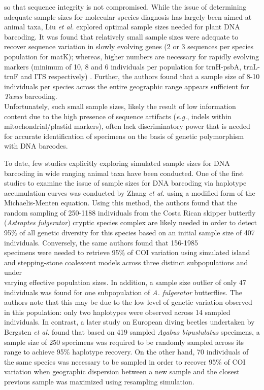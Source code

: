 so that sequence integrity is not compromised. While the issue of determining adequate sample sizes for molecular species diagnosis has largely been aimed at animal taxa, Liu \textit{et al.} \cite{liu2012sampling} explored optimal sample sizes needed for plant DNA barcoding. It was found that relatively small sample sizes were adequate to recover sequence variation in slowly evolving genes (2 or 3 sequences per species population for matK); whereas, higher numbers are necessary for rapidly evolving markers (minimum of 10, 8 and 6 individuals per population for trnH-psbA, trnL-trnF and ITS respectively) \cite{liu2012sampling}. Further, the authors found that a sample size of 8-10 individuals per species across the entire geographic range appears sufficient for \textit{Taxus} barcoding. \\ Unfortunately, such small sample sizes, likely the result of low information content due to the high presence of sequence artifacts (\textit{e.g.}, indels within mitochondrial/plastid markers), often lack discriminatory power that is needed for accurate identification of specimens on the basis of genetic polymorphism with DNA barcodes.

\vspace{5mm} 

To date, few studies explicitly exploring simulated sample sizes for DNA barcoding in wide ranging animal taxa have been conducted. One of the first studies to examine the issue of sample sizes for DNA barcoding via haplotype accumulation curves was conducted by Zhang \textit{et al.} \cite{zhang2010estimating} using a modified form of the Michaelis-Menten equation. Using this method, the authors found that the random sampling of 250-1188 individuals from the Costa Rican skipper butterfly (\textit{Astraptes fulgerator}) cryptic species complex are likely needed in order to detect 95\% of all genetic diversity for this species based on an initial sample size of 407 individuals. Conversely, the same authors found that 156-1985 \\ specimens were needed to retrieve 95\% of COI variation using simulated island \cite{wright1951genetical} and stepping-stone \cite{kimura1964stepping} coalescent models across three distinct subpopulations and under \\ varying effective population sizes. In addition, a sample size outlier of only 47 individuals was found for one subpopulation of \textit{A. fulgerator} butterflies.  The authors note that this may be due to the low level of genetic variation observed in this population: only two haplotypes were observed across 14 sampled individuals. In contrast, a later study on European diving beetles undertaken by Bergsten \textit{et al.} \cite{bergsten2012effect} found that based on 419 sampled \textit{Agabus bipustulatus} specimens, a sample size of 250 specimens was required to be randomly sampled across its range to achieve 95\% haplotype recovery. On the other hand, 70 individuals of the same species was necessary to be sampled in order to recover 95\% of COI variation when geographic dispersion between a new sample and the closest previous sample was maximized using resampling simulation. 

